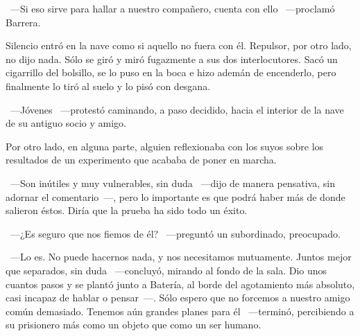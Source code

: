 ~---Si eso sirve para hallar a nuestro compañero, cuenta con ello ~---proclamó Barrera.

Silencio entró en la nave como si aquello no fuera con él. Repulsor, por otro lado, no dijo nada. Sólo se giró y miró fugazmente a sus dos interlocutores. Sacó un cigarrillo del bolsillo, se lo puso en la boca e hizo ademán de encenderlo, pero finalmente lo tiró al suelo y lo pisó con desgana.

~---Jóvenes ~---protestó caminando, a paso decidido, hacia el interior de la nave de su antiguo socio y amigo.

\parbreak
Por otro lado, en alguna parte, alguien reflexionaba con los suyos sobre los resultados de un experimento que acababa de poner en marcha.

~---Son inútiles y muy vulnerables, sin duda ~---dijo de manera pensativa, sin adornar el comentario~---, pero lo importante es que podrá haber más de donde salieron éstos. Diría que la prueba ha sido todo un éxito.

~---¿Es seguro que nos fiemos de él? ~---preguntó un subordinado, preocupado.

~---Lo es. No puede hacernos nada, y nos necesitamos mutuamente. Juntos mejor que separados, sin duda ~---concluyó, mirando al fondo de la sala. Dio unos cuantos pasos y se plantó junto a Batería, al borde del agotamiento más absoluto, casi incapaz de hablar o pensar~---. Sólo espero que no forcemos a nuestro amigo común demasiado. Tenemos aún grandes planes para él ~---terminó, percibiendo a su prisionero más como un objeto que como un ser humano.

\endinput
